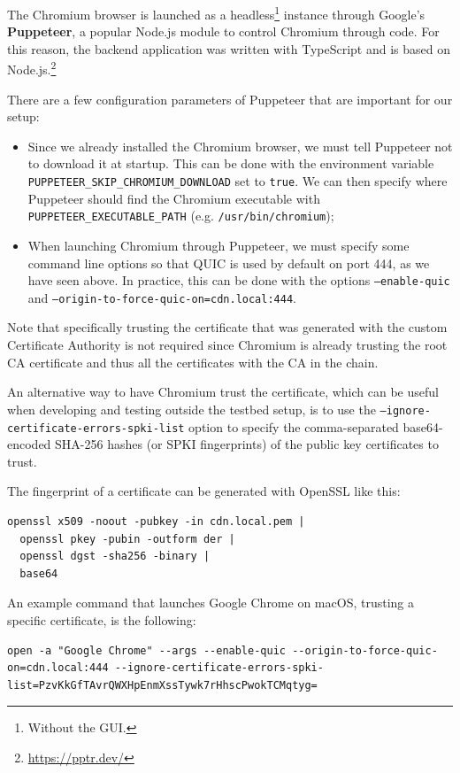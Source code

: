 The Chromium browser is launched as a headless\footnote{Without the GUI.} instance through Google's \textbf{Puppeteer}, a popular Node.js module to control Chromium through code. For this reason, the backend application was written with TypeScript and is based on Node.js.\footnote{\url{https://pptr.dev/}}

There are a few configuration parameters of Puppeteer that are important for our setup:

\begin{itemize}
    \item Since we already installed the Chromium browser, we must tell Puppeteer not to download it at startup. This can be done with the environment variable \texttt{PUPPETEER\_SKIP\_CHROMIUM\_DOWNLOAD} set to \texttt{true}. We can then specify where Puppeteer should find the Chromium executable with \texttt{PUPPETEER\_EXECUTABLE\_PATH} (e.g. \texttt{/usr/bin/chromium});
    \item When launching Chromium through Puppeteer, we must specify some command line options so that QUIC is used by default on port 444, as we have seen above. In practice, this can be done with the options \texttt{--enable-quic} and \texttt{--origin-to-force-quic-on=cdn.local:444}.
\end{itemize}

Note that specifically trusting the certificate that was generated with the custom Certificate Authority is not required since Chromium is already trusting the root CA certificate and thus all the certificates with the CA in the chain.

An alternative way to have Chromium trust the certificate, which can be useful when developing and testing outside the testbed setup, is to use the \texttt{--ignore-certificate-errors-spki-list} option to specify the comma-separated base64-encoded SHA-256 hashes (or SPKI fingerprints) of the public key certificates to trust.

The fingerprint of a certificate can be generated with OpenSSL like this:

\begin{verbatim}
openssl x509 -noout -pubkey -in cdn.local.pem |
  openssl pkey -pubin -outform der |
  openssl dgst -sha256 -binary |
  base64
\end{verbatim}

An example command that launches Google Chrome on macOS, trusting a specific certificate, is the following:

\begin{verbatim}
open -a "Google Chrome" --args --enable-quic --origin-to-force-quic-on=cdn.local:444 --ignore-certificate-errors-spki-list=PzvKkGfTAvrQWXHpEnmXssTywk7rHhscPwokTCMqtyg=
\end{verbatim}

